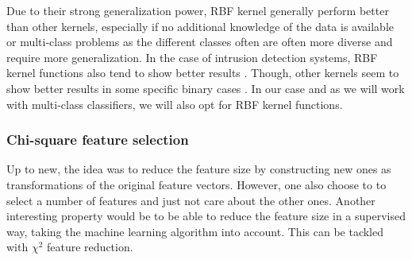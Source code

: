 Due to their strong generalization power, RBF kernel generally perform better than other kernels, especially if no additional knowledge of the data is available or multi-class problems as the different classes often are often more diverse and require more generalization. In the case of intrusion detection systems, RBF kernel functions also tend to show better results \cite{Kuang2014ADetection}. Though, other kernels seem to show better results in some specific binary cases \cite{Elkhadir2016IntrusionMethods}. In our case and as we will work with multi-class classifiers, we will also opt for RBF kernel functions.

\subsubsection{Chi-square feature selection}
Up to new, the idea was to reduce the feature size by constructing new ones as transformations of the original feature vectors. However, one also choose to to select a number of features and just not care about the other ones. Another interesting property would be to be able to reduce the feature size in a supervised way, taking the machine learning algorithm into account. This can be tackled with $\chi^2$ feature reduction.

